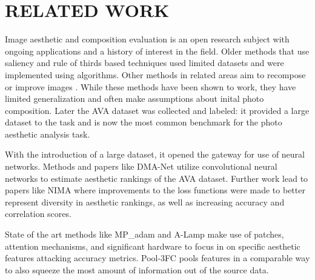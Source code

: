 \section{RELATED WORK}
Image aesthetic and composition evaluation is an open research subject with ongoing applications and a history of interest in the field. Older methods that use saliency and rule of thirds based techniques \cite{oldphotocomp} used limited datasets and were implemented using algorithms. Other methods in related areas aim to recompose or improve images \cite{oldqualityassess}. While these methods have been shown to work, they have limited generalization and often make assumptions about inital photo composition. Later the AVA dataset \cite{AVA} was collected and labeled: it provided a large dataset to the task and is now the most common benchmark for the photo aesthetic analysis task.

With the introduction of a large dataset, it opened the gateway for use of neural networks.  Methods and papers like  DMA-Net \cite{DMA-Net} utilize convolutional neural networks to estimate aesthetic rankings of the AVA dataset. Further work lead to papers like NIMA \cite{NIMA} where improvements to the loss functions were made to better represent diversity in aesthetic rankings, as well as increasing accuracy and correlation scores. 

State of the art methods like MP\_adam \cite{MPADAM} and A-Lamp \cite{A-LAMP} make use of patches, attention mechanisms, and significant hardware to focus in on specific aesthetic features attacking accuracy metrics. Pool-3FC \cite{POOL3FC}  pools features in a comparable way to also squeeze the most amount of information out of the source data.